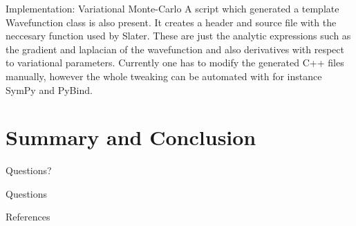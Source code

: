 \documentclass[10pt]{beamer}
\begin{document}
\begin{frame}[fragile]{Implementation: Variational Monte-Carlo}
    A script which generated a template Wavefunction class is also present. It
    creates a header and source file with the neccesary function used by
    Slater. These are just the analytic expressions such as the gradient and
    laplacian of the wavefunction and also derivatives with respect to
    variational parameters. Currently one has to modify the generated C++ files
    manually, however the whole tweaking can be automated with for instance
    SymPy and PyBind.
\end{frame}

\section{Summary and Conclusion}

{
\begin{frame}[standout]
  Questions?
\end{frame}
}

\appendix

\begin{frame}[fragile]{Questions}
\end{frame}

\begin{frame}[allowframebreaks]{References}

  
  

\end{frame}
\end{document}
